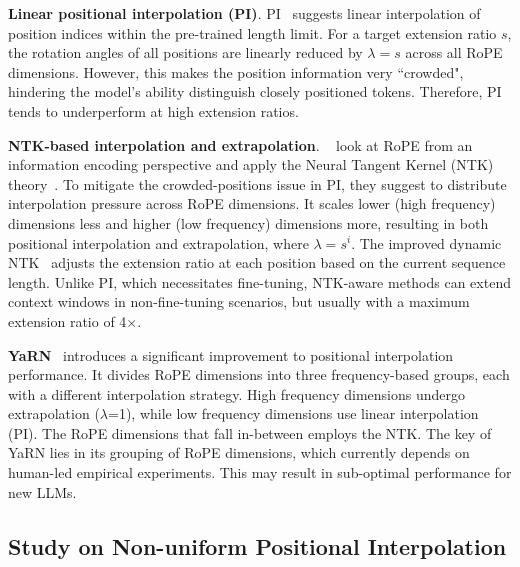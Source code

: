 \textbf{Linear positional interpolation (PI)}. PI~\cite{pi}  suggests linear interpolation of position indices within the pre-trained length limit. For a target extension ratio $s$, the rotation angles of all positions are linearly reduced by $\lambda=s$  across all RoPE dimensions. However, this makes the position information very ``crowded", hindering the model's ability distinguish closely positioned tokens. Therefore, PI tends to underperform at high extension ratios.

\textbf{NTK-based interpolation and extrapolation}. ~\cite{ntk,dynamicntk} look at RoPE from an information encoding perspective  and apply the Neural Tangent Kernel (NTK) theory~\cite{jacot2018neural,tancik2020fourier}. To mitigate the crowded-positions issue in PI, they suggest to distribute interpolation pressure across RoPE dimensions. It scales lower (high frequency) dimensions less and higher (low frequency) dimensions more, resulting in  both positional interpolation and extrapolation, where $\lambda=s^{i}$. The improved dynamic NTK~\cite{dynamicntk}  adjusts the extension ratio at each position based on the current sequence length. Unlike PI, which necessitates fine-tuning, NTK-aware methods can extend context windows in non-fine-tuning scenarios, but usually with a maximum extension ratio of 4$\times$. 

\textbf{YaRN}~\cite{yarn} introduces a significant improvement to positional interpolation performance. It divides RoPE dimensions into three frequency-based groups, each with a different interpolation strategy. High frequency dimensions undergo extrapolation ($\lambda$=1), while low frequency dimensions use linear interpolation (PI). The RoPE dimensions that fall in-between employs the NTK. The key of YaRN lies in its grouping of RoPE dimensions, which currently depends on human-led empirical experiments. This may result in sub-optimal performance for new LLMs. 

\subsection{Study on Non-uniform Positional Interpolation}

